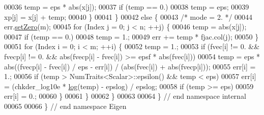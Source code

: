 \begin{DoxyCode}
00036             temp = eps * abs(x[j]);
00037             \textcolor{keywordflow}{if} (temp == 0.)
00038                 temp = eps;
00039             xp[j] = x[j] + temp;
00040         \}
00041     \}
00042     \textcolor{keywordflow}{else} \{
00043         \textcolor{comment}{/* mode = 2. */}
00044         err.\hyperlink{class_eigen_1_1_plain_object_base_ac21ad5f989f320e46958b75ac8d9a1da}{setZero}(m); 
00045         \textcolor{keywordflow}{for} (Index j = 0; j < n; ++j) \{
00046             temp = abs(x[j]);
00047             \textcolor{keywordflow}{if} (temp == 0.)
00048                 temp = 1.;
00049             err += temp * fjac.col(j);
00050         \}
00051         \textcolor{keywordflow}{for} (Index i = 0; i < m; ++i) \{
00052             temp = 1.;
00053             \textcolor{keywordflow}{if} (fvec[i] != 0. && fvecp[i] != 0. && abs(fvecp[i] - fvec[i]) >= epsf * abs(fvec[i]))
00054                 temp = eps * abs((fvecp[i] - fvec[i]) / eps - err[i]) / (abs(fvec[i]) + abs(fvecp[i]));
00055             err[i] = 1.;
00056             \textcolor{keywordflow}{if} (temp > NumTraits<Scalar>::epsilon() && temp < eps)
00057                 err[i] = (chkder\_log10e * \hyperlink{structlog}{log}(temp) - epslog) / epslog;
00058             \textcolor{keywordflow}{if} (temp >= eps)
00059                 err[i] = 0.;
00060         \}
00061     \}
00062 \}
00063 
00064 \} \textcolor{comment}{// end namespace internal}
00065 
00066 \} \textcolor{comment}{// end namespace Eigen}
\end{DoxyCode}
